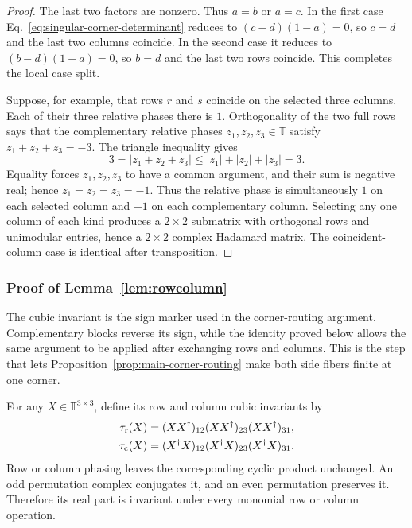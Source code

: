 \documentclass[aps,prx,reprint,nofootinbib,twoside,superscriptaddress,longbibliography,floatfix]{revtex4-2}
\theoremstyle{definition}
\newcommand{\T}{\mathbb T}
\begin{document}
\begin{proof}
The last two factors are nonzero. Thus $a=b$ or $a=c$. In the first case Eq.~\eqref{eq:singular-corner-determinant} reduces to $(c-d)(1-a)=0$, so $c=d$ and the last two columns coincide. In the second case it reduces to $(b-d)(1-a)=0$, so $b=d$ and the last two rows coincide. This completes the local case split.

Suppose, for example, that rows $r$ and $s$ coincide on the selected three columns. Each of their three relative phases there is $1$. Orthogonality of the two full rows says that the complementary relative phases $z_1,z_2,z_3\in\T$ satisfy $z_1+z_2+z_3=-3$. The triangle inequality gives
\begin{equation}
3=|z_1+z_2+z_3|\leq |z_1|+|z_2|+|z_3|=3.
\end{equation}
Equality forces $z_1,z_2,z_3$ to have a common argument, and their sum is negative real; hence $z_1=z_2=z_3=-1$. Thus the relative phase is simultaneously $1$ on each selected column and $-1$ on each complementary column. Selecting any one column of each kind produces a $2\times2$ submatrix with orthogonal rows and unimodular entries, hence a $2\times2$ complex Hadamard matrix. The coincident-column case is identical after transposition.
\end{proof}

\subsubsection{{Proof of Lemma~\ref{lem:rowcolumn}}}
\label{sec:invariant}

{The cubic invariant is the sign marker used in the corner-routing argument. Complementary blocks reverse its sign, while the identity proved below allows the same argument to be applied after exchanging rows and columns. This is the step that lets Proposition~\ref{prop:main-corner-routing} make both side fibers finite at one corner.}

For any $X\in\T^{3\times3}$, define its row and column cubic invariants by
\begin{equation}
\begin{aligned}
\tau_{\rm r}(X)&=(XX^{\dagger})_{12}(XX^{\dagger})_{23}
(XX^{\dagger})_{31},\\
\tau_{\rm c}(X)&=(X^{\dagger}X)_{12}(X^{\dagger}X)_{23}
(X^{\dagger}X)_{31}.
\end{aligned}
\label{eq:cubicinvariants}
\end{equation}
Row or column phasing leaves the corresponding cyclic product unchanged. An odd permutation complex conjugates it, and an even permutation preserves it. Therefore its real part is invariant under every monomial row or column operation.
\end{document}
